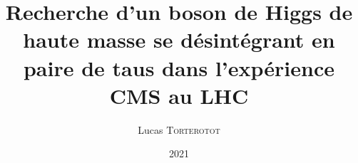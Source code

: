 \documentclass[11pt,a4paper,twoside]{book}
\institute[UCBL]{Université Claude Bernard Lyon 1} %
\title{Recherche d'un boson de Higgs de haute masse se désintégrant en paire de taus dans l'expérience CMS au LHC}
\author[L. \textsc{Torterotot}]{Lucas \textsc{Torterotot}}
\date{\todo{XX xxxx} 2021}
\begin{document}
\pagestyle{empty}

\cleardoublepage
~\vfill
\begin{flushright}
\end{flushright}
\vfill\vfill~
\cleardoublepage

\cleardoublepage
\frontmatter
\tableofcontents

\mainmatter


\backmatter

\printbibliography
\end{document}
